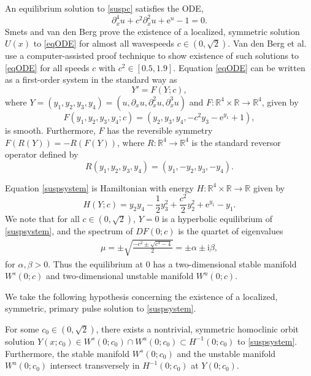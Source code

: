 \documentclass[review,onefignum,onetabnum]{siamart171218}
\newcommand{\R}{\mathbb{R}}
\newcommand{\rme}{\mathrm{e}}
\newcommand{\rmi}{\mathrm{i}}
\begin{document}
An equilibrium solution to \cref{suspc} satisfies the ODE,
\begin{equation}\label{eqODE}
\partial_x^4u +  c^2\partial_x^2u + \rme^{u} - 1 = 0.
\end{equation}
Smets and van den Berg \cite[Theorem 11]{Smets2002} prove the existence of a localized, symmetric solution $U(x)$ to \cref{eqODE} for almost all wavespeeds $c \in (0, \sqrt{2})$. Van den Berg et al. \cite[Theorem~1]{Berg2018} use a computer-assisted proof technique to show existence of such solutions to \cref{eqODE} for all speeds $c$ with $c^2 \in [0.5, 1.9]$.
Equation \cref{eqODE} can be written as a first-order system in the standard way as
\begin{equation}\label{suspsystem}
Y' = F(Y; c),
\end{equation}
where $Y = (y_1, y_2, y_3, y_4) = (u, \partial_x u, \partial_x^2 u, \partial_x^3 u)$ and $F: \R^4 \times \R \rightarrow \R^4$, given by
\begin{equation}\label{suspF}
F(y_1, y_2, y_3, y_4; c) = (y_2, y_3, y_4, -c^2 y_3 - \rme^{y_1} + 1),
\end{equation}
is smooth. Furthermore, $F$ has the reversible symmetry $F(R(Y)) = -R(F(Y))$, where $R: \R^4 \rightarrow \R^4$ is the standard reversor operator defined by
\[
R(y_1, y_2, y_3, y_4) = (y_1, -y_2, y_3, -y_4).
\]

Equation \cref{suspsystem} is Hamiltonian with energy $H:\R^4 \times \R \rightarrow \R$ given by
\begin{equation}\label{suspH}
H(Y; c) = y_2 y_4 - \frac{1}{2}y_3^2 + \frac{c^2}{2}y_2^2 + \rme^{y_1} - y_1.
\end{equation}
We note that for all $c \in (0, \sqrt{2})$, $Y = 0$ is a hyperbolic equilibrium of \cref{suspsystem}, and the spectrum of $DF(0; c)$ is the quartet of eigenvalues
\begin{align}\label{specA00}
\mu = \pm \sqrt{\frac{-c^2 \pm \sqrt{c^4 - 4}}{2} } = \pm \alpha \pm \rmi\beta,
\end{align}
for $\alpha, \beta > 0$. Thus the equilibrium at 0 has a two-dimensional stable manifold $W^s(0; c)$ and two-dimensional unstable manifold $W^u(0; c)$.

We take the following hypothesis concerning the existence of a localized, symmetric, primary pulse solution to \cref{suspsystem}.
\begin{hypothesis}\label{Uexistshyp}
For some $c_0 \in (0, \sqrt{2})$, there exists a nontrivial, symmetric homoclinic orbit solution $Y(x; c_0) \in W^s(0; c_0) \cap W^u(0; c_0) \subset H^{-1}(0; c_0)$ to \cref{suspsystem}. Furthermore, the stable manifold $W^s(0; c_0)$ and the unstable manifold $W^u(0; c_0)$ intersect transversely in $H^{-1}(0; c_0)$ at $Y(0; c_0)$.
\end{hypothesis}
\end{document}
